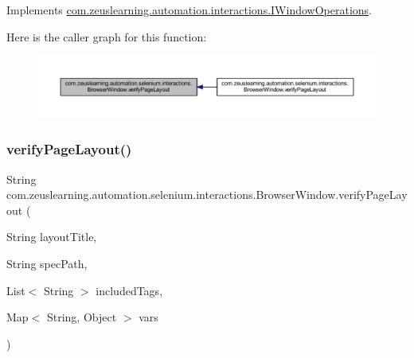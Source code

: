 Implements \hyperlink{interfacecom_1_1zeuslearning_1_1automation_1_1interactions_1_1IWindowOperations_a9908b638a8d279ad70831154e366f080}{com.\+zeuslearning.\+automation.\+interactions.\+I\+Window\+Operations}.

Here is the caller graph for this function\+:
\nopagebreak
\begin{figure}[H]
\begin{center}
\leavevmode
\includegraphics[width=350pt]{d8/d87/classcom_1_1zeuslearning_1_1automation_1_1selenium_1_1interactions_1_1BrowserWindow_a7fdf7cc7035b78a95a35e3f7b6989430_icgraph}
\end{center}
\end{figure}
\hypertarget{classcom_1_1zeuslearning_1_1automation_1_1selenium_1_1interactions_1_1BrowserWindow_a3ea69b7cde363086381c0f8b4e2df474}{}\label{classcom_1_1zeuslearning_1_1automation_1_1selenium_1_1interactions_1_1BrowserWindow_a3ea69b7cde363086381c0f8b4e2df474} 
\subsubsection{\texorpdfstring{verify\+Page\+Layout()}{verifyPageLayout()}\hspace{0.1cm}{\footnotesize\ttfamily [2/3]}}
{\footnotesize\ttfamily String com.\+zeuslearning.\+automation.\+selenium.\+interactions.\+Browser\+Window.\+verify\+Page\+Layout (\begin{DoxyParamCaption}\item[{String}]{layout\+Title,  }\item[{String}]{spec\+Path,  }\item[{List$<$ String $>$}]{included\+Tags,  }\item[{Map$<$ String, Object $>$}]{vars }\end{DoxyParamCaption})\hspace{0.3cm}{\ttfamily [inline]}}

